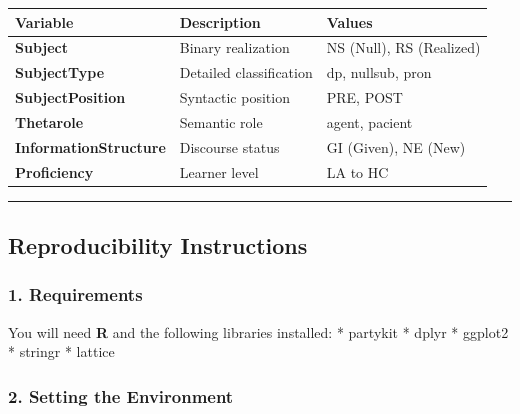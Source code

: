\documentclass[
  letterpaper,
  DIV=11,
  numbers=noendperiod]{scrartcl}
\newcounter{none} %
\begin{document}
{\def\LTcaptype{none} %
\begin{longtable}[]{@{}
  >{\raggedright\arraybackslash}p{}
  >{\raggedright\arraybackslash}p{}
  >{\raggedright\arraybackslash}p{}@{}}
\toprule\noalign{}
\begin{minipage}[b]{\linewidth}\raggedright
Variable
\end{minipage} & \begin{minipage}[b]{\linewidth}\raggedright
Description
\end{minipage} & \begin{minipage}[b]{\linewidth}\raggedright
Values
\end{minipage} \\
\midrule\noalign{}
\endhead
\bottomrule\noalign{}
\endlastfoot
\textbf{Subject} & Binary realization & NS (Null), RS (Realized) \\
\textbf{SubjectType} & Detailed classification & dp, nullsub, pron \\
\textbf{SubjectPosition} & Syntactic position & PRE, POST \\
\textbf{Thetarole} & Semantic role & agent, pacient \\
\textbf{InformationStructure} & Discourse status & GI (Given), NE
(New) \\
\textbf{Proficiency} & Learner level & LA to HC \\
\end{longtable}
}

\begin{center}\rule{0.5\linewidth}{0.5pt}\end{center}

\subsection{Reproducibility
Instructions}\label{reproducibility-instructions}

\subsubsection{1. Requirements}\label{requirements}

You will need \textbf{R} and the following libraries installed: *
partykit * dplyr * ggplot2 * stringr * lattice

\subsubsection{2. Setting the
Environment}\label{setting-the-environment}
\end{document}
